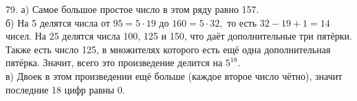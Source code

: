 79. а) Самое большое простое число в этом ряду равно 157.\\
б) На 5 делятся числа от $95=5\cdot19$ до $160=5\cdot32,$ то есть $32-19+1=14$ чисел. На 25 делятся числа 100, 125 и 150, что даёт дополнительные три пятёрки. Также есть число 125, в множителях которого есть ещё одна дополнительная пятёрка. Значит, всего это произведение делится на $5^{18}.$\\
в) Двоек в этом произведении ещё больше (каждое второе число чётно), значит последние 18 цифр равны 0.\\
